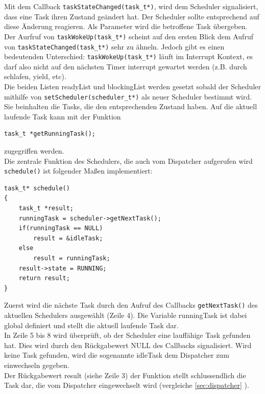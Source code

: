\documentclass[fontsize=12pt, toc=bibliography, notitlepage]{scrreprt}
\newcommand{\refnn}[1]{\ref{#1} \nameref{#1}}
\begin{document}
Mit dem Callback \lstinline$taskStateChanged(task_t*)$, wird dem Scheduler signalisiert, dass eine Task ihren Zustand geändert hat. Der Scheduler sollte entsprechend auf diese Änderung reagieren. Als Parameter wird die betroffene Task übergeben.\\

Der Aurfruf von \lstinline$taskWokeUp(task_t*)$ scheint auf den ersten Blick dem Aufruf von \lstinline$taskStateChanged(task_t*)$ sehr zu ähneln. Jedoch gibt es einen bedeutenden Unterschied: \lstinline$taskWokeUp(task_t*)$ läuft im Interrupt Kontext, es darf also nicht auf den nächsten Timer interrupt gewartet werden (z.B. durch schlafen, yield, etc).\\

Die beiden Listen readyList und blockingList werden gesetzt sobald der Scheduler mithilfe von \lstinline$setScheduler(scheduler_t*)$ als neuer Scheduler bestimmt wird. Sie beinhalten die Tasks, die den entsprechenden Zustand haben. Auf die aktuell laufende Task kann mit der Funktion

\begin{lstlisting}
task_t *getRunningTask();
\end{lstlisting}

zugegriffen werden.\\

Die zentrale Funktion des Schedulers, die auch vom Dispatcher aufgerufen wird \lstinline$schedule()$ ist folgender Maßen implementiert:

\begin{lstlisting}[title=scheduler.c]
task_t* schedule()
{
	task_t *result;
	runningTask = scheduler->getNextTask();
	if(runningTask == NULL)
		result = &idleTask;
	else
		result = runningTask;
	result->state = RUNNING;
	return result;
}
\end{lstlisting}

Zuerst wird die nächste Task durch den Aufruf des Callbacks \lstinline$getNextTask()$ des aktuellen Schedulers ausgewählt (Zeile 4). Die Variable runningTask ist dabei global definiert und stellt die aktuell laufende Task dar.\\

In Zeile 5 bis 8 wird überprüft, ob der Scheduler eine lauffähige Task gefunden hat. Dies wird durch den Rückgabewert NULL des Callbacks signalisiert. Wird keine Task gefunden, wird die sogenannte idleTask dem Dispatcher zum einwechseln gegeben.\\

Der Rückgabewert result (siehe Zeile 3) der Funktion stellt schlussendlich die Task dar, die vom Dispatcher eingewechselt wird (vergleiche \refnn{sec:dispatcher}).
\end{document}
